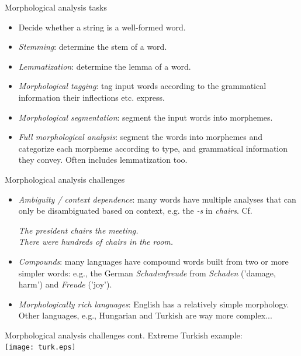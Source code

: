\documentclass[style=upen, size=14pt]{powerdot}
\newcommand{\gold}{\color{arany}}
\begin{document}
\begin{slide}[toc=]{Morphological analysis tasks}
  \begin{itemize}
  \item Decide whether a string is a well-formed word.
  \item \emph{\gold Stemming}: determine the stem of a word.
  \item \emph{\gold Lemmatization}: determine the lemma of a word.
  \item \emph{\gold Morphological tagging}: tag input words according to the grammatical
    information their inflections etc. express.
  \item \emph{\gold Morphological segmentation}: segment the input words into morphemes.
  \item \emph{\gold Full morphological analysis}: segment the words into morphemes and
    categorize each morpheme according to type, and grammatical information they
    convey. Often includes lemmatization too.
  \end{itemize}
\end{slide}

\begin{slide}[toc=]{Morphological analysis challenges}
  \begin{itemize}
  \item \emph{\gold Ambiguity / context dependence}: many words have multiple
    analyses that can only be disambiguated based on context, e.g.  the
    \emph{-s} in \emph{chairs}. Cf.\smallskip

    \emph{The president {\gold chairs} the meeting.}\\ 
    \emph{There were hundreds of {\gold chairs} in the room.}\smallskip 
    
  \item \emph{\gold Compounds}: many languages have compound words built from
    two or more simpler words: e.g., the German \emph{Schadenfreude} from
    \emph{Schaden} ('damage, harm') and \emph{Freude} ('joy').
  \item \emph{\gold Morphologically rich languages}: English has a relatively
    simple morphology. Other languages, e.g., Hungarian and Turkish are way more
    complex...
  \end{itemize}
\end{slide}

\begin{slide}[toc=]{Morphological analysis challenges cont.}
  Extreme Turkish example:\smallskip\\
    \texttt{[image: turk.eps]}
\end{slide}
\end{document}
